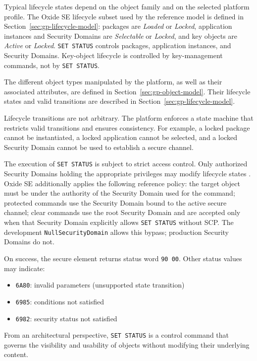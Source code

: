 Typical lifecycle states depend on the object family and on the selected
platform profile. The Oxide SE lifecycle subset used by the reference model is
defined in Section~\ref{sec:gp-lifecycle-model}: packages are
\emph{Loaded} or \emph{Locked}, application instances and Security Domains are
\emph{Selectable} or \emph{Locked}, and key objects are \emph{Active} or
\emph{Locked}. \texttt{SET STATUS} controls packages, application instances,
and Security Domains. Key-object lifecycle is controlled by key-management
commands, not by \texttt{SET STATUS}.

The different object types manipulated by the platform, as well as their
associated attributes, are defined in Section~\ref{sec:gp-object-model}. Their
lifecycle states and valid transitions are described in
Section~\ref{sec:gp-lifecycle-model}.

Lifecycle transitions are not arbitrary. The platform enforces a state machine
that restricts valid transitions and ensures consistency. For example, a locked
package cannot be instantiated, a locked application cannot be selected, and a
locked Security Domain cannot be used to establish a secure channel.

The execution of \texttt{SET STATUS} is subject to strict access control. Only
authorized Security Domains holding the appropriate privileges may modify
lifecycle states .
Oxide SE additionally applies the following reference policy: the target
object must be under the authority of the Security Domain used for the command;
protected commands use the Security Domain bound to the active secure channel;
clear commands use the root Security Domain and are accepted only when that
Security Domain explicitly allows \texttt{SET STATUS} without SCP. The
development \texttt{NullSecurityDomain} allows this bypass; production
Security Domains do not.

On success, the secure element returns status word \texttt{90 00}. Other status values
may indicate:
\begin{itemize}
\item \texttt{6A80}: invalid parameters (unsupported state transition)
\item \texttt{6985}: conditions not satisfied
\item \texttt{6982}: security status not satisfied
\end{itemize}

From an architectural perspective, \texttt{SET STATUS} is a control command
that governs the visibility and usability of objects without modifying their
underlying content.

